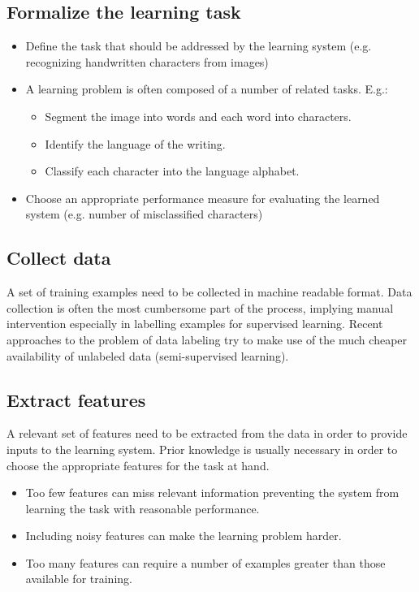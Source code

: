\documentclass[a4paper, 10pt, titlepage]{article}
\begin{document}
\subsection{Formalize the learning task}
\begin{itemize}
\item Define the task that should be addressed by the learning system (e.g. recognizing handwritten characters from images)
\item A learning problem is often composed of a number of related tasks. E.g.:
\begin{itemize}
\item Segment the image into words and each word into characters.
\item Identify the language of the writing.
\item Classify each character into the language alphabet.
\end{itemize}
\item Choose an appropriate performance measure for evaluating the learned system (e.g. number of misclassified
characters)
\end{itemize}

\subsection{Collect data}
A set of training examples need to be collected in machine readable format. Data collection is often the most cumbersome part of the process, implying manual intervention especially in labelling examples for supervised learning.
Recent approaches to the problem of data labeling try to make use of the much cheaper availability of unlabeled
data (semi-supervised learning).

\subsection{Extract features}
A relevant set of features need to be extracted from the data in order to provide inputs to the learning system. Prior knowledge is usually necessary in order to choose the appropriate features for the task at hand. 
\begin{itemize}
\item Too few features can miss relevant information preventing the system from learning the task with reasonable
performance. 
\item Including noisy features can make the learning problem harder.
\item Too many features can require a number of examples greater than those available for training.
\end{itemize}
\end{document}
